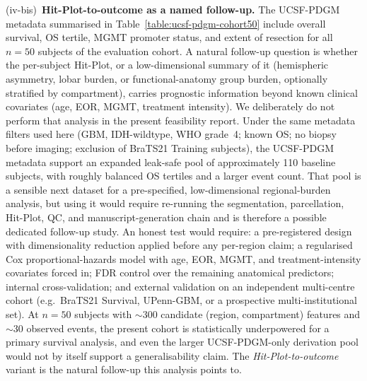 \documentclass[a4paper,11pt,leqno]{article}
\begin{document}
(iv-bis)~\textbf{Hit-Plot-to-outcome as a named follow-up.}
The UCSF-PDGM metadata summarised in
Table~\ref{table:ucsf-pdgm-cohort50} include overall survival, OS
tertile, MGMT promoter status, and extent of resection for all
$n=50$ subjects of the evaluation cohort. A natural follow-up
question is whether the per-subject Hit-Plot, or a low-dimensional
summary of it (hemispheric asymmetry, lobar burden, or
functional-anatomy group burden, optionally stratified by
compartment), carries prognostic information beyond known clinical
covariates (age, EOR, MGMT, treatment intensity). We deliberately do not
perform that analysis in the present feasibility report. Under the
same metadata filters used here (GBM, IDH-wildtype, WHO grade~4;
known OS; no biopsy before imaging; exclusion of BraTS21 Training
subjects), the UCSF-PDGM metadata support an expanded leak-safe pool
of approximately 110 baseline subjects, with roughly balanced OS
tertiles and a larger event count. That pool is a sensible next
dataset for a pre-specified, low-dimensional regional-burden analysis,
but using it would require re-running the segmentation, parcellation,
Hit-Plot, QC, and manuscript-generation chain and is therefore a possible
dedicated follow-up study. An honest test would require: a pre-registered design with
dimensionality reduction applied before any per-region claim; a
regularised Cox proportional-hazards model with age, EOR, MGMT, and
treatment-intensity covariates forced in; FDR control over the
remaining anatomical predictors; internal cross-validation; and
external validation on an independent multi-centre cohort
(e.g.\ BraTS21 Survival, UPenn-GBM, or a prospective
multi-institutional set). At $n=50$ subjects with $\sim$300
candidate (region, compartment) features and $\sim$30 observed
events, the present cohort is statistically underpowered for a
primary survival analysis, and even the larger UCSF-PDGM-only
derivation pool would not by itself support a generalisability claim.
The \emph{Hit-Plot-to-outcome} variant is
the natural follow-up this analysis points to.
\end{document}
